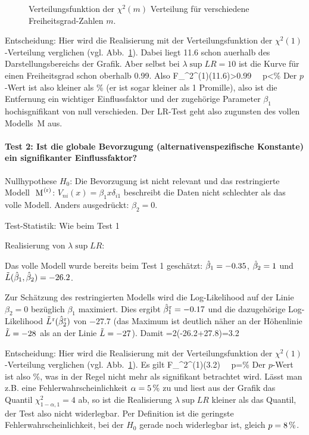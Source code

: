 \begin{figure}
\caption{\label{fig:chi2}Verteilungsfunktion der $\chi^2(m)$ Verteilung f\"ur
  verschiedene Freiheitsgrad-Zahlen $m$.}
\end{figure}

\item Entscheidung: Hier wird die Realisierung mit der Verteilungsfunktion der
  $\chi^2(1)$-Verteilung verglichen (vgl. Abb.~\ref{fig:chi2}).
Dabei liegt 11.6 schon au\3erhalb des Darstellungsbereichs der Grafik. Aber
selbst bei $\lambda\sup{LR}=10$ ist die Kurve f\"ur einen Freiheitsgrad schon oberhalb
0.99. Also
\bdm
F_{\chi^2}^{(1)}(11.6)>0.99 \ \Rightarrow \ p<\unit[1]{\%}
\edm
Der $p$-Wert ist also kleiner als \unit[1]{\%} (er ist sogar kleiner als 1
Promille), also ist die Entfernung ein wichtiger Einflussfaktor und der
zugeh\"orige Parameter $\beta_1$ hochisgnifikant von null verschieden.
Der LR-Test geht also zugunsten des vollen Modells~M aus.
\eenum

\paragraph{Test 2: Ist die globale Bevorzugung (alternativenspezifische
  Konstante)  ein signifikanter Einflussfaktor?}
\benum
\item Nullhypothese $H_0$: Die Bevorzugung  ist nicht relevant und das
  restringierte Modell ${\mbox{ M}}^{\!\!{\mbox{ \scriptsize{(r)}}}}$: $V_{ni}(x)=\beta_1x\delta_{i1}$ 
beschreibt die Daten nicht
  schlechter als das volle Modell. Anders ausgedr\"uckt: $\beta_2=0$.

\item Test-Statistik: Wie beim Test 1
 
\item Realisierung von $\lambda\sup{LR}$:
\bi
\item Das volle Modell wurde bereits beim Test 1 gesch\"atzt: 
$\hat{\beta}_1=-0.35$, $\hat{\beta}_2=1$ und $\tilde{L}(\hat{\beta}_1,\hat{\beta}_2)=-26.2$.
\item Zur Sch\"atzung des restringierten Modells wird die Log-Likelihood auf der
Linie $\beta_2=0$ bez\"uglich $\beta_1$ maximiert. Dies
ergibt $\hat{\beta}_1^{\!\!{\mbox{ \scriptsize{r}}}}=-0.17$ und die dazugeh\"orige Log-Likelihood 
$\tilde{L}^{\!\!{\mbox{ \scriptsize{r}}}}(\hat{\beta}_2^{\!\!{\mbox{ \scriptsize{r}}}})$ von $-27.7$ (das Maximum ist deutlich
n\"aher an der H\"ohenlinie $\tilde{L}=-28$ als an der Linie $\tilde{L}=-27$). 
\ei
Damit 
\bdm
\lambda{}=2(-26.2+27.8)=3.2
\edm

\item Entscheidung: Hier wird die Realisierung mit der Verteilungsfunktion der
  $\chi^2(1)$-Verteilung verglichen (vgl. Abb.~\ref{fig:chi2}).
Es gilt 
\bdm
F_{\chi^2}^{(1)}(3.2) \ \Rightarrow \ p=\unit[8]{\%}
\edm
Der $p$-Wert ist also \unit[8]{\%}, was in der Regel nicht mehr als
signifikant betrachtet wird. L\"asst man z.B. eine Fehlerwahrscheinlichkeit
$\alpha=\unit[5]{\%}$ zu und liest aus der Grafik das Quantil
$\chi^2_{1-\alpha,1}=4$ ab, so ist die Realisierung $\lambda\sup{LR}$ kleiner als das
Quantil, der Test also nicht widerlegbar. Per Definition ist die geringste
Fehlerwahrscheinlichkeit, bei der $H_0$ gerade noch widerlegbar ist, gleich
$p=\unit[8]{\%}$. 

